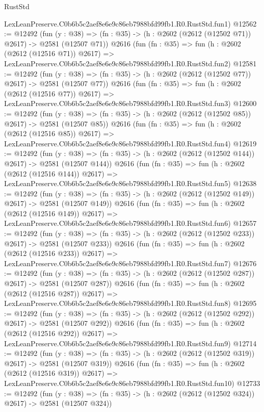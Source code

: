 \begin{lexlean}{RustStd}
\begin{coremodule}
    LexLeanPreserve.C0b6b5c2aef8e6e9c86eb7988bfd99fb1.R0.RustStd.fun1)
@12562 := @12492
    (fun (y : @38) => (fn : @35) -> (h : @2602 (@2612 (@12502 @71)) @2617) -> @2581 (@12507 @71))
    @2616
    (fun (fn : @35) =>
    fun (h : @2602 (@2612 (@12516 @71)) @2617) =>
    LexLeanPreserve.C0b6b5c2aef8e6e9c86eb7988bfd99fb1.R0.RustStd.fun2)
@12581 := @12492
    (fun (y : @38) => (fn : @35) -> (h : @2602 (@2612 (@12502 @77)) @2617) -> @2581 (@12507 @77))
    @2616
    (fun (fn : @35) =>
    fun (h : @2602 (@2612 (@12516 @77)) @2617) =>
    LexLeanPreserve.C0b6b5c2aef8e6e9c86eb7988bfd99fb1.R0.RustStd.fun3)
@12600 := @12492
    (fun (y : @38) => (fn : @35) -> (h : @2602 (@2612 (@12502 @85)) @2617) -> @2581 (@12507 @85))
    @2616
    (fun (fn : @35) =>
    fun (h : @2602 (@2612 (@12516 @85)) @2617) =>
    LexLeanPreserve.C0b6b5c2aef8e6e9c86eb7988bfd99fb1.R0.RustStd.fun4)
@12619 := @12492
    (fun (y : @38) => (fn : @35) -> (h : @2602 (@2612 (@12502 @144)) @2617) -> @2581 (@12507 @144))
    @2616
    (fun (fn : @35) =>
    fun (h : @2602 (@2612 (@12516 @144)) @2617) =>
    LexLeanPreserve.C0b6b5c2aef8e6e9c86eb7988bfd99fb1.R0.RustStd.fun5)
@12638 := @12492
    (fun (y : @38) => (fn : @35) -> (h : @2602 (@2612 (@12502 @149)) @2617) -> @2581 (@12507 @149))
    @2616
    (fun (fn : @35) =>
    fun (h : @2602 (@2612 (@12516 @149)) @2617) =>
    LexLeanPreserve.C0b6b5c2aef8e6e9c86eb7988bfd99fb1.R0.RustStd.fun6)
@12657 := @12492
    (fun (y : @38) => (fn : @35) -> (h : @2602 (@2612 (@12502 @233)) @2617) -> @2581 (@12507 @233))
    @2616
    (fun (fn : @35) =>
    fun (h : @2602 (@2612 (@12516 @233)) @2617) =>
    LexLeanPreserve.C0b6b5c2aef8e6e9c86eb7988bfd99fb1.R0.RustStd.fun7)
@12676 := @12492
    (fun (y : @38) => (fn : @35) -> (h : @2602 (@2612 (@12502 @287)) @2617) -> @2581 (@12507 @287))
    @2616
    (fun (fn : @35) =>
    fun (h : @2602 (@2612 (@12516 @287)) @2617) =>
    LexLeanPreserve.C0b6b5c2aef8e6e9c86eb7988bfd99fb1.R0.RustStd.fun8)
@12695 := @12492
    (fun (y : @38) => (fn : @35) -> (h : @2602 (@2612 (@12502 @292)) @2617) -> @2581 (@12507 @292))
    @2616
    (fun (fn : @35) =>
    fun (h : @2602 (@2612 (@12516 @292)) @2617) =>
    LexLeanPreserve.C0b6b5c2aef8e6e9c86eb7988bfd99fb1.R0.RustStd.fun9)
@12714 := @12492
    (fun (y : @38) => (fn : @35) -> (h : @2602 (@2612 (@12502 @319)) @2617) -> @2581 (@12507 @319))
    @2616
    (fun (fn : @35) =>
    fun (h : @2602 (@2612 (@12516 @319)) @2617) =>
    LexLeanPreserve.C0b6b5c2aef8e6e9c86eb7988bfd99fb1.R0.RustStd.fun10)
@12733 := @12492
    (fun (y : @38) => (fn : @35) -> (h : @2602 (@2612 (@12502 @324)) @2617) -> @2581 (@12507 @324))

\end{coremodule}
\end{lexlean}
